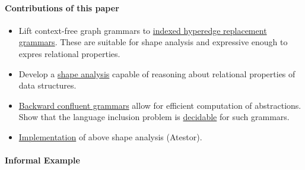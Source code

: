 \documentclass[a4paper,12pt]{article}
\begin{document}
\paragraph{Contributions of this paper}

\begin{itemize}
	\item Lift context-free graph grammars to \ul{indexed hyperedge replacement grammars}. These are suitable for shape analysis and expressive enough to expres relational properties.
	\item Develop a \ul{shape analysis} capable of reasoning about relational properties of data structures.
	\item \ul{Backward confluent grammars} allow for efficient computation of abstractions. Show that the language inclusion problem is \ul{decidable} for such grammars.
	\item \ul{Implementation} of above shape analysis (Atestor).
\end{itemize}

\paragraph{Informal Example}
\end{document}
